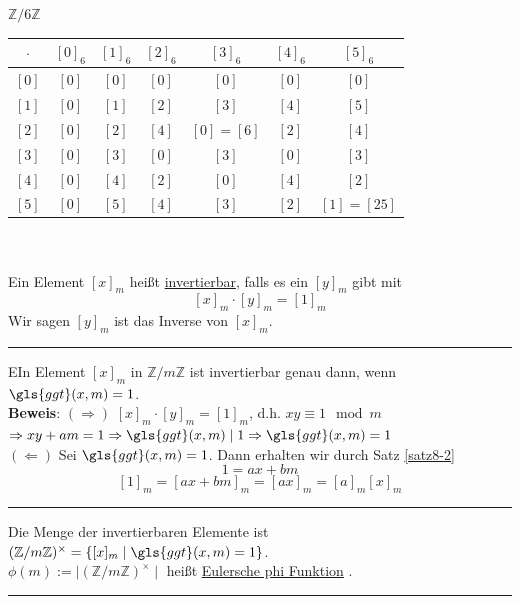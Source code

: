 \documentclass[9pt]{article}
\begin{document}
\begin{bsp}
$\mathbb{Z}/6\mathbb{Z}$ \\
\begin{tabular}{c|cccccc}
    $\cdot$ & $[0]_6$ & $[1]_6$ & $[2]_6$ & $[3]_6$ & $[4]_6$ & $[5]_6$   \\ \hline
    $[0]$ & $[0]$ & $[0]$ & $[0]$ & $[0]$ & $[0]$ & $[0]$ \\
    $[1]$ & $[0]$ & $[1]$ & $[2]$ & $[3]$ & $[4]$& $[5]$ \\
    $[2]$ & $[0]$ & $[2]$ & $[4]$ & $[0] = [6]$ & $[2]$ & $[4]$ \\
    $[3]$& $[0]$& $[3]$& $[0]$& $[3]$& $[0]$& $[3]$\\
    $[4]$ & $[0]$& $[4]$& $[2]$& $[0]$&$[4]$ &$[2]$ \\
    $[5]$ &$[0]$ &$[5]$ &$[4]$ &$[3]$ &$[2]$ & $[1] = [25]$\\
\end{tabular} \\  \newline
{} \\
Ein Element $[x]_m$ heißt \underline{invertierbar}, falls es ein $[y]_m$ gibt mit \[[x]_m \cdot [y]_m = [1]_m\]
Wir sagen $[y]_m$ ist das Inverse von $[x]_m$.
\end{bsp} \noindent \rule{8cm}{0.4pt}
\begin{satz}
EIn Element $[x]_m$ in $\mathbb{Z} / m \mathbb{Z}$ ist invertierbar genau dann, wenn $\gls{ggt}(x,m) = 1$. \\
\textbf{Beweis}: $(\Rightarrow)$ $[x]_m \cdot [y]_m = [1]_m$, d.h. $xy \equiv 1 \mod m$ \\
$\Rightarrow xy + am = 1 \Rightarrow \gls{ggt}(x,m) \mid 1 \Rightarrow \gls{ggt}(x,m) = 1$\\
$(\Leftarrow)$ Sei $\gls{ggt}(x,m) = 1$. Dann erhalten wir durch Satz \ref{satz8-2}
\[ 1 = ax + bm\]
\[ [1]_m = [ax+bm]_m = [ax]_m = [a]_m [x]_m\]
 \end{satz} \noindent \rule{8cm}{0.4pt}
\begin{folg}
Die Menge der invertierbaren Elemente ist $(\mathbb{Z} / m \mathbb{Z})^{\times} = \{[x]_m \mid \gls{ggt}(x,m) = 1\}$. \\
$\phi(m) := \mid (\mathbb{Z} / m \mathbb{Z})^{\times} \mid $ heißt \underline{Eulersche phi Funktion} .
\end{folg} \noindent \rule{8cm}{0.4pt} 
\end{document}
